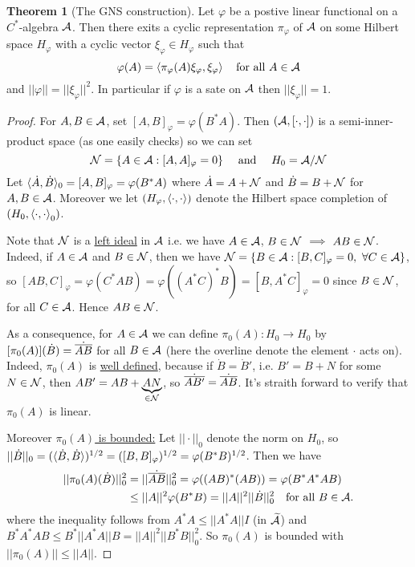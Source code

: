 \documentclass[10pt,english,a4paper]{article}
\theoremstyle{definition}
\newtheorem*{theorem}{Theorem}
\def\tAs{\widetilde{\As}}
\def\dA{\dot{A}}
\def\dB{\dot{B}}
\def\dA{\dot{A}}
\def\dB{\dot{B}}
\def\vphi{\varphi}
\begin{document}
\begin{theorem}[The GNS construction]
    Let $\vphi$ be a postive linear functional on a $C^*$-algebra $\mathcal{A}$. Then 
there exits a cyclic representation $\pi_{\vphi}$ of $\mathcal{A}$ on some Hilbert space 
$H_{\vphi}$ with a cyclic vector $\xi_{\vphi} \in H_{\vphi}$ such that 
\[ \vphi(A) = \ind{\pi_{\vphi}(A)\xi_{\vphi},\xi_{\vphi}}\quad \text{for all }
A \in \As \]
and $||\vphi|| = ||\xi_{\vphi}||^2$. In particular if $\vphi$ is a sate on $\mathcal{A}$
then $|| \xi_{\vphi} || = 1$.
\end{theorem}
\begin{proof}
    For $A,B \in \mathcal{A}$, set $[A,B]_{\vphi} = \vphi(B^*A)$. Then 
$(\mathcal{A},[\cdot,\cdot])$ is a semi-inner-product space (as one easily checks) 
so we can set 
\[ \Ns = \{ A \in \As : [A,A]_{\vphi} = 0 \} \quad \text{ and } \quad 
H_0 = \As /\Ns\]
Let $\indi{\dA,\dB}_0 = [A,B]_{\vphi} = \vphi(B^*A)$ where 
$\dA = A + \Ns$ and $\dB = B  + \Ns$ for $A,B \in \mathcal{A}$.
Moreover we let $(H_{\vphi}, \ind{\cdot,\cdot})$ denote the Hilbert space completion
of $(H_0, \left\langle \cdot,\cdot \right\rangle_0)$. 

Note that $\mathcal{N}$ is a \ul{left ideal} in $\mathcal{A}$
i.e. we have $A \in \mathcal{A}$, $B \in \mathcal{N}$ $\implies$ $AB \in \mathcal{N}$.
Indeed, if $A \in \mathcal{A}$ and $B \in \mathcal{N}$, then we have 
$\Ns = \{ B \in \As : [B,C]_{\vphi}= 0, ~\forall C \in \As\}$, so
$[AB,C]_{\vphi} = \vphi(C^*AB) = \vphi((A^*C)^*B) = [B,A^*C]_{\vphi} = 0$ since $B\in \mathcal{N}$, 
for all $C \in \mathcal{A}$. Hence $AB \in \mathcal{N}$.

As a consequence, for $A \in \mathcal{A}$ we can define $\pi_{0}(A)\colon H_0 \to H_0$
by $[\pi_0(A)](\dB) = \dot{\ol{AB}}$ for all $B \in \mathcal{A}$ (here the overline denote the 
element $\cdot$ acts on).
Indeed, $\pi_0(A)$ is \ul{well defined}, because 
if $\dB = \dB'$, i.e. $B' = B + N$ for some $N \in \mathcal{N}$, then
$AB' = AB + \underbrace{AN}_{\in \mathcal{N}}$, so $\dot{\overline{AB'}} = \dot{\overline{AB}}$.
It's straith forward to verify that $\pi_0(A)$ is linear.

Moreover \ul{$\pi_0(A)$ is bounded:}
Let $||\cdot||_0$ denote the norm on $H_0$, so 
$||\dB||_0 = (\indi{\dB, \dB})^{1/2} = ([B,B]_{\vphi})^{1/2} =
\vphi(B^*B)^{1/2}$. 
Then we have
\begin{align*}
    ||\pi_0(A)(\dB)||_{0}^{2} &= ||\dot{\ol{AB}}||_{0}^{2} = \vphi((AB)^*(AB)) 
   = \vphi(B^*A^*AB) \\
    &\leq ||A||^2\vphi(B^*B) = ||A||^2 ||\dot{B}||_{0}^{2} \quad \text{for all
    } B \in \As.
\end{align*}
where the inequality follows from $A^*A \leq ||A^*A|| I$ (in $\tAs$) and 
$B^*A^*AB \leq B^*||A^*A||B = ||A||^2 ||B^*B||_{0}^{2}$.
So $\pi_0(A)$ is bounded with $||\pi_0(A)|| \leq ||A||$. 


\end{proof}
\end{document}
